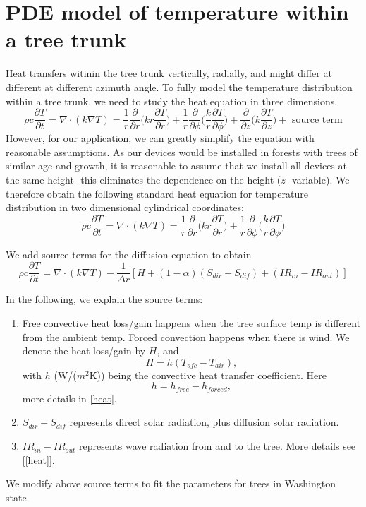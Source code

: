 \documentclass[12pt]{article}
\begin{document}
\section{PDE model of temperature within a tree trunk}
Heat transfers witinin the tree trunk vertically, radially, and might differ at different at different azimuth angle. To fully model the temperature distribution within a tree trunk, we need to study the heat equation in three dimensions. 
\begin{equation}
\rho c \frac{\partial T}{\partial t}=\nabla\cdot(k\nabla T)=\frac{1}{r}\frac{\partial}{\partial r}\bigg(kr\frac{\partial T}{\partial r}\bigg)+\frac{1}{r}\frac{\partial}{\partial \phi}\bigg(\frac{k}{r}\frac{\partial T}{\partial \phi}\bigg)+\frac{\partial}{\partial z}\bigg(k\frac{\partial T}{\partial z}\bigg)+\text{ source term}\label{heat3d}
\end{equation}
However, for our application, we can greatly simplify the equation with reasonable assumptions. As our devices would be installed in forests with trees of similar age and growth, it is reasonable to assume that we install all devices at the same height- this eliminates the dependence on the height ($z$- variable). We therefore obtain the following standard heat equation for temperature distribution in two dimensional cylindrical coordinates:
\begin{equation}
\rho c\frac{\partial T}{\partial t}=\nabla\cdot(k\nabla T)=\frac{1}{r}\frac{\partial}{\partial r}\bigg(kr\frac{\partial T}{\partial r}\bigg)+\frac{1}{r}\frac{\partial}{\partial \phi}\bigg(\frac{k}{r}\frac{\partial T}{\partial \phi}\bigg)\label{heat2d}
\end{equation}

We add source terms for the diffusion equation to obtain
\begin{equation}
\rho c\frac{\partial T}{\partial t}=\nabla\cdot(k\nabla T)-\frac{1}{\Delta r}[H+(1-\alpha)(S_{dir}+S_{dif})+(IR_{in}-IR_{out})]
\end{equation}

In the following, we explain the source terms: 
\begin{enumerate}
\item 
Free convective heat loss/gain happens when the tree surface temp is different from the ambient temp. Forced convection happens when there is wind. We denote the heat loss/gain by $H$, and 
\begin{equation}
H=h(T_{sfc}-T_{air}),
\end{equation}
with $h$ (W/($m^2$K)) being the convective heat transfer coefficient. Here
\begin{equation}
h=h_{free}-h_{forced},
\end{equation}
more details in \ref{heat}. 

\item $S_{dir}+S_{dif}$ represents direct solar radiation, plus diffusion solar radiation. 

\item $IR_{in}-IR_{out}$ represents wave radiation from and to the tree. More details see [\ref{heat}].

\end{enumerate}
We modify above source terms to fit the parameters for trees in Washington state.
\end{document}
